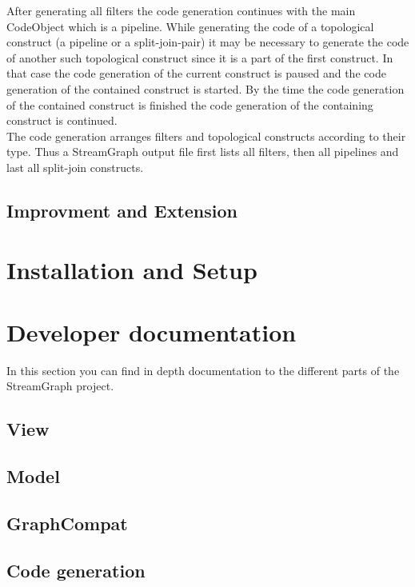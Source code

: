 \documentclass[journal]{IEEEtran}
\begin{document}
After generating all filters the code generation continues with the main
CodeObject which is a pipeline. While generating the code of a topological
construct (a pipeline or a split-join-pair) it may be necessary to generate the
code of another such topological construct since it is a part of the first
construct. In that case the code generation of the current construct is paused
and the code generation of the contained construct is started. By the time the
code generation of the contained construct is finished the code generation of
the containing construct is continued.\\

The code generation arranges filters and topological constructs according to
their type. Thus a StreamGraph output file first lists all filters, then all
pipelines and last all split-join constructs.\\

\subsection{Improvment and Extension}



\section{Installation and Setup}



\section{Developer documentation}
\noindent In this section you can find in depth documentation to the different
parts of the StreamGraph project.
\subsection{View}



\subsection{Model}



\subsection{GraphCompat}



\subsection{Code generation}
\end{document}
